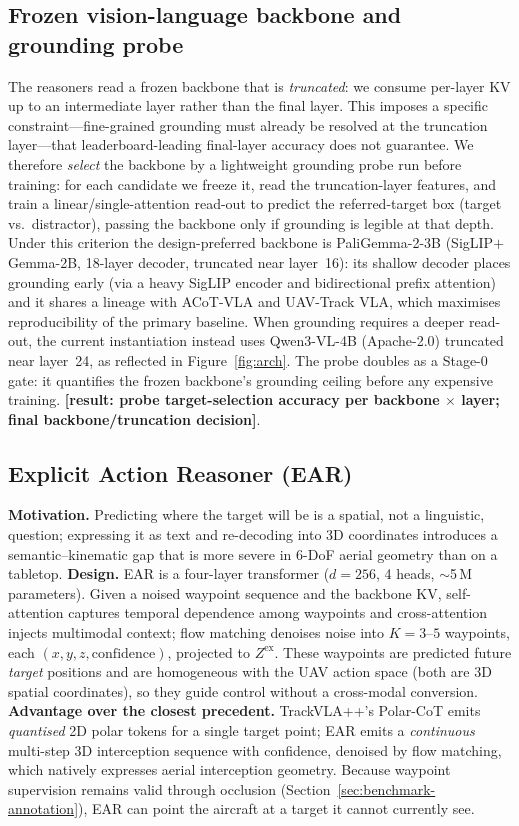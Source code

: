\documentclass[11pt]{article}
\newcommand{\ph}[1]{{\color{red}\textbf{[#1]}}}
\newcommand{\ear}{EAR}
\newcommand{\zex}{Z^{\mathrm{ex}}}
\begin{document}
\subsection{Frozen vision-language backbone and grounding probe}
\label{sec:method-backbone}
The reasoners read a frozen backbone that is \emph{truncated}: we consume
per-layer KV up to an intermediate layer rather than the final layer. This
imposes a specific constraint---fine-grained grounding must already be
resolved at the truncation layer---that leaderboard-leading final-layer
accuracy does not guarantee. We therefore \emph{select} the backbone by a lightweight
grounding probe run before training: for each candidate we freeze it, read
the truncation-layer features, and train a linear/single-attention read-out
to predict the referred-target box (target vs.\ distractor), passing the
backbone only if grounding is legible at that depth. Under this criterion the
design-preferred backbone is PaliGemma-2-3B (SigLIP${+}$Gemma-2B,
18-layer decoder, truncated near layer~16): its shallow decoder places
grounding early (via a heavy SigLIP encoder and bidirectional prefix
attention) and it shares a lineage with ACoT-VLA and UAV-Track VLA, which
maximises reproducibility of the primary baseline. When grounding requires a
deeper read-out, the current instantiation instead uses Qwen3-VL-4B
(Apache-2.0) truncated near layer~24, as reflected in
Figure~\ref{fig:arch}. The probe doubles as a Stage-0 gate: it quantifies the
frozen backbone's grounding ceiling before any expensive training.
\ph{result: probe target-selection accuracy per backbone $\times$ layer;
final backbone/truncation decision}.

\subsection{Explicit Action Reasoner (\ear{})}
\label{sec:method-ear}
\textbf{Motivation.} Predicting where the target will be is a spatial, not a
linguistic, question; expressing it as text and re-decoding into 3D
coordinates introduces a semantic--kinematic gap that is more severe in
6-DoF aerial geometry than on a tabletop.
\textbf{Design.} \ear{} is a four-layer transformer ($d{=}256$, 4 heads,
$\sim$5\,M parameters). Given a noised waypoint sequence and the
backbone KV, self-attention captures temporal dependence among waypoints and
cross-attention injects multimodal context; flow matching denoises noise into
$K{=}3$--$5$ waypoints, each $(x,y,z,\text{confidence})$, projected to
$\zex$. These waypoints are predicted future \emph{target} positions and are
homogeneous with the UAV action space (both are 3D spatial coordinates), so
they guide control without a cross-modal conversion.
\textbf{Advantage over the closest precedent.} TrackVLA++'s Polar-CoT emits
\emph{quantised} 2D polar tokens for a single target point; \ear{} emits a
\emph{continuous} multi-step 3D interception sequence with confidence,
denoised by flow matching, which natively expresses aerial interception
geometry. Because waypoint supervision remains valid through occlusion
(Section~\ref{sec:benchmark-annotation}), \ear{} can point the aircraft at a
target it cannot currently see.
\end{document}
